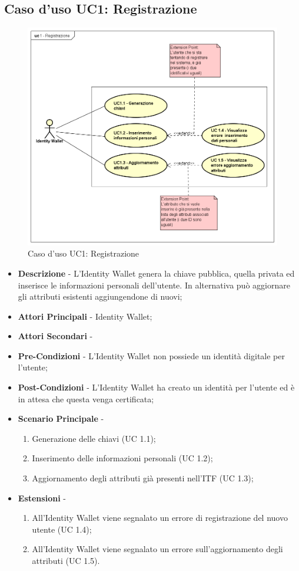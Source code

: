 \subsection{Caso d'uso UC1: Registrazione}
\begin{figure}[!h]
	\centering
	\includegraphics[scale=0.35]{immagini/usecase/UC1_Registrazione}
	\caption{Caso d'uso UC1: Registrazione}
\end{figure}
\begin{itemize}
	\item \textbf{Descrizione} - L'Identity Wallet genera la chiave pubblica, quella privata ed inserisce le informazioni personali dell'utente. In alternativa può aggiornare gli attributi esistenti aggiungendone di nuovi;
	\item \textbf{Attori Principali} - Identity Wallet;
	\item \textbf{Attori Secondari} -
	\item \textbf{Pre-Condizioni} - L'Identity Wallet non possiede un identità digitale per l'utente;
	\item \textbf{Post-Condizioni} - L'Identity Wallet ha creato un identità per l'utente ed è in attesa che questa venga certificata;
	\item \textbf{Scenario Principale} - 
	\begin{enumerate}
		\item Generazione delle chiavi (UC 1.1);
		\item Inserimento delle informazioni personali (UC 1.2);
		\item Aggiornamento degli attributi già presenti nell'\gls{ITF} (UC 1.3);
	\end{enumerate}
	\item \textbf{Estensioni} -
	\begin{enumerate}
		\item All'Identity Wallet viene segnalato un errore di registrazione del nuovo utente (UC 1.4);
		\item All'Identity Wallet viene segnalato un errore sull'aggiornamento degli attributi (UC 1.5).
	\end{enumerate}
\end{itemize}
\newpage
